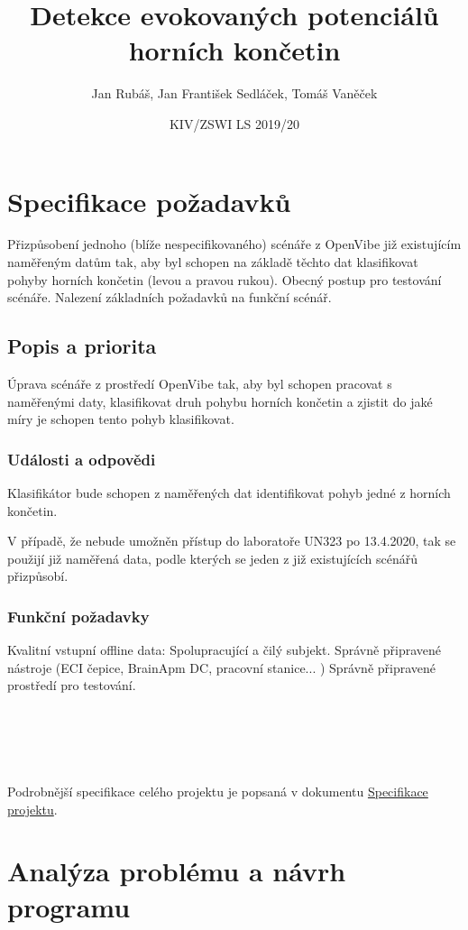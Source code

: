 \documentclass{report}
\title{Detekce evokovaných potenciálů horních končetin}
\author{Jan Rubáš, Jan František Sedláček, Tomáš Vaněček}
\date{KIV/ZSWI LS 2019/20}
\begin{document}
\maketitle
\tableofcontents
%
\chapter{Specifikace požadavků}
Přizpůsobení jednoho (blíže nespecifikovaného) scénáře z OpenVibe již existujícím naměřeným datům tak, aby byl schopen na základě těchto dat klasifikovat pohyby horních končetin (levou a pravou rukou).
Obecný postup pro testování scénáře.
Nalezení základních požadavků na funkční scénář.

\section{Popis a priorita}
Úprava scénáře z prostředí OpenVibe tak, aby byl schopen pracovat s naměřenými daty, klasifikovat druh pohybu horních končetin a zjistit do jaké míry je schopen tento pohyb klasifikovat.

\subsection{Události a odpovědi}
Klasifikátor bude schopen z naměřených dat identifikovat pohyb jedné z horních končetin.

V případě, že nebude umožněn přístup do laboratoře UN323 po 13.4.2020, tak se použijí již naměřená data, podle kterých se jeden z již existujících scénářů přizpůsobí.

\subsection{Funkční požadavky}
Kvalitní vstupní offline data:
Spolupracující a čilý subjekt.
Správně připravené nástroje (ECI čepice, BrainApm DC, pracovní stanice... )
Správně připravené prostředí pro testování.
\\
\\
\\
\\
\\
\\
Podrobnější specifikace celého projektu je popsaná v dokumentu
\href{https://docs.google.com/document/d/1LbMN5tFxxpSZ1Gf7irw77nM88PaOCfTKEih6rNO8mn0/edit?usp=sharing}{Specifikace projektu}.


\chapter{Analýza problému a návrh programu}
%
\end{document}
